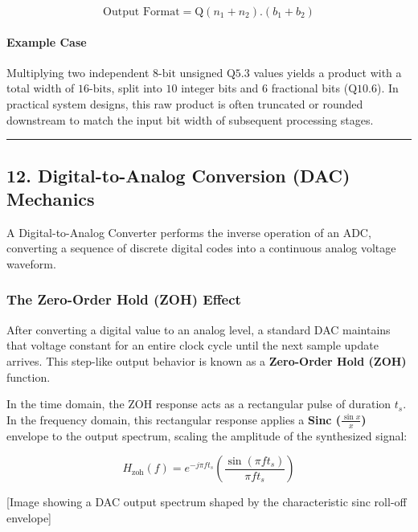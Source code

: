\documentclass[
]{article}
\begin{document}
\[\text{Output Format} = \text{Q}(n_1 + n_2).(b_1 + b_2)\]

\paragraph{Example Case}\label{example-case-1}

Multiplying two independent \(8\text{-bit}\) unsigned \(\text{Q}5.3\)
values yields a product with a total width of \(16\text{-bits}\), split
into \(10\) integer bits and \(6\) fractional bits (\(\text{Q}10.6\)).
In practical system designs, this raw product is often truncated or
rounded downstream to match the input bit width of subsequent processing
stages.

\begin{center}\rule{0.5\linewidth}{0.5pt}\end{center}

\subsection{12. Digital-to-Analog Conversion (DAC)
Mechanics}\label{digital-to-analog-conversion-dac-mechanics}

A Digital-to-Analog Converter performs the inverse operation of an ADC,
converting a sequence of discrete digital codes into a continuous analog
voltage waveform.

\subsubsection{The Zero-Order Hold (ZOH)
Effect}\label{the-zero-order-hold-zoh-effect}

After converting a digital value to an analog level, a standard DAC
maintains that voltage constant for an entire clock cycle until the next
sample update arrives. This step-like output behavior is known as a
\textbf{Zero-Order Hold (ZOH)} function.

In the time domain, the ZOH response acts as a rectangular pulse of
duration \(t_s\). In the frequency domain, this rectangular response
applies a \textbf{Sinc (\(\frac{\sin x}{x}\))} envelope to the output
spectrum, scaling the amplitude of the synthesized signal:

\[H_{\text{zoh}}(f) = e^{-j\pi f t_s} \left( \frac{\sin\left(\pi f t_s\right)}{\pi f t_s} \right)\]

{[}Image showing a DAC output spectrum shaped by the characteristic sinc
roll-off envelope{]}
\end{document}
